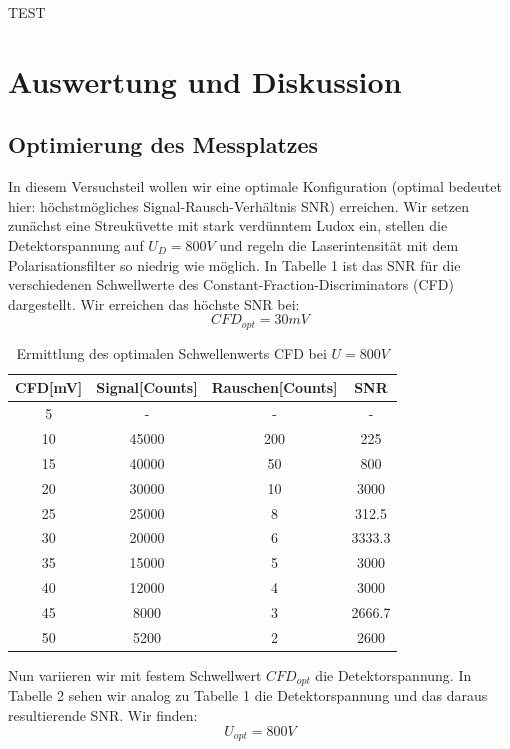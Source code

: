 \documentclass{article}
\begin{document}
TEST

\section{Auswertung und Diskussion}
\subsection{Optimierung des Messplatzes}
In diesem Versuchsteil wollen wir eine optimale Konfiguration (optimal bedeutet hier: höchstmögliches
Signal-Rausch-Verhältnis SNR) erreichen. Wir setzen zunächst eine Streuküvette mit stark verdünntem
Ludox ein, stellen die Detektorspannung auf $U_D=800V$ und regeln die Laserintensität mit dem Polarisationsfilter so niedrig
wie möglich. In Tabelle 1 ist das SNR für die verschiedenen Schwellwerte des Constant-Fraction-Discriminators (CFD) dargestellt.
Wir erreichen das höchste SNR bei: $$CFD_{opt}=30mV$$

\begin{table}[h]
  \centering
  \begin{tabular}{c|c|c|c}
    CFD[mV] & Signal[Counts] & Rauschen[Counts] & SNR \\
    \hline
    5       &     -          & -                & -\\
    10      & 45000          & 200              & 225\\
    15      & 40000          & 50               & 800\\
    20      & 30000          & 10               & 3000\\
    25      & 25000          & 8                & 312.5\\
    30      & 20000          & 6                & 3333.3\\
    35      & 15000          & 5                & 3000\\
    40      & 12000          & 4                & 3000\\
    45      & 8000           & 3                & 2666.7\\
    50      & 5200           & 2                & 2600\\
  \end{tabular}
  \caption{Ermittlung des optimalen Schwellenwerts CFD bei $U=800V$}
\end{table}

Nun variieren wir mit festem Schwellwert $CFD_{opt}$ die Detektorspannung. In Tabelle 2 sehen wir analog zu
Tabelle 1 die Detektorspannung und das daraus resultierende SNR. Wir finden: $$ U_{opt}=800V$$
\end{document}
